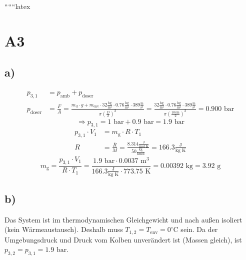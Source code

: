 
``````latex


\section*{A3}

\subsection*{a)}
\begin{align*}
    p_{3,1} &= p_{\text{amb}} + p_{\text{doser}} \\
    p_{\text{doser}} &= \frac{F}{A} = \frac{m_{\text{d}} \cdot g + m_{\text{env}} \cdot 32 \frac{\text{kg}}{\text{m}^2} \cdot 0.76 \frac{\text{kg}}{\text{m}^2} \cdot 389 \frac{\text{m}}{\text{s}^2}}{\pi \left( \frac{D}{2} \right)^2} = \frac{32 \frac{\text{kg}}{\text{m}^2} \cdot 0.76 \frac{\text{kg}}{\text{m}^2} \cdot 389 \frac{\text{m}}{\text{s}^2}}{\pi \left( \frac{10 \text{cm}}{2} \right)^2} = 0.900 \text{ bar}
\end{align*}
\[
\Rightarrow p_{3,1} = 1 \text{ bar} + 0.9 \text{ bar} = 1.9 \text{ bar}
\]
\begin{align*}
    p_{3,1} \cdot V_1 &= m_{\text{g}} \cdot R \cdot T_1 \\
    R &= \frac{\bar{R}}{M} = \frac{8.314 \frac{\text{J}}{\text{mol K}}}{50 \frac{\text{kg}}{\text{kmol}}} = 166.3 \frac{\text{J}}{\text{kg K}}
\end{align*}
\[
m_{\text{g}} = \frac{p_{3,1} \cdot V_1}{R \cdot T_1} = \frac{1.9 \text{ bar} \cdot 0.0037 \text{ m}^3}{166.3 \frac{\text{J}}{\text{kg K}} \cdot 773.75 \text{ K}} = 0.00392 \text{ kg} = 3.92 \text{ g}
\]

\subsection*{b)}
Das System ist im thermodynamischen Gleichgewicht und nach außen isoliert (kein Wärmeaustausch). Deshalb muss $T_{1,2} = T_{\text{env}} = 0^\circ \text{C}$ sein. Da der Umgebungsdruck und Druck vom Kolben unverändert ist (Massen gleich), ist $p_{3,2} = p_{3,1} = 1.9 \text{ bar}$.

